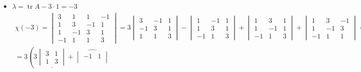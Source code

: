 \begin{itemize}
$$\begin{pmatrix}
    	1 \\
        1 \\
        0 \\
        0
    \end{pmatrix},
    \begin{pmatrix}
    	1 \\
        0 \\
        0 \\
        -1
    \end{pmatrix} \right\rangle $$
    \item $ \lambda = \operatorname{tr}A - 3 \cdot 1 = -3 $
    \begin{multline*}
        \chi(-3) =
        \begin{vmatrix}
            3 & 1 & 1 & -1 \\
            1 & 3 & -1 & 1 \\
            1 & -1 & 3 & 1 \\
            -1 & 1 & 1 & 3
        \end{vmatrix} = 3
        \begin{vmatrix}
        	3 & -1 & 1 \\
            -1 & 3 & 1 \\
            1 & 1 & 3
        \end{vmatrix} -
        \begin{vmatrix}
        	1 & -1 & 1 \\
            1 & 3 & 1 \\
            -1 & 1 & 3
        \end{vmatrix} +
        \begin{vmatrix}
        	1 & 3 & 1 \\
            1 & -1 & 1 \\
            -1 & 1 & 3
        \end{vmatrix} +
        \begin{vmatrix}
        	1 & 3 & -1 \\
            1 & -1 & 3 \\
            -1 & 1 & 1
        \end{vmatrix} = \\
        = 3 \left( 3 \underline{
            \begin{vmatrix}
                3 & 1 \\
                1 & 3
            \end{vmatrix}} + \widehat{
            \begin{vmatrix}
                -1 & 1 \\

\end{vmatrix}}
\end{multline*}
\end{itemize}
